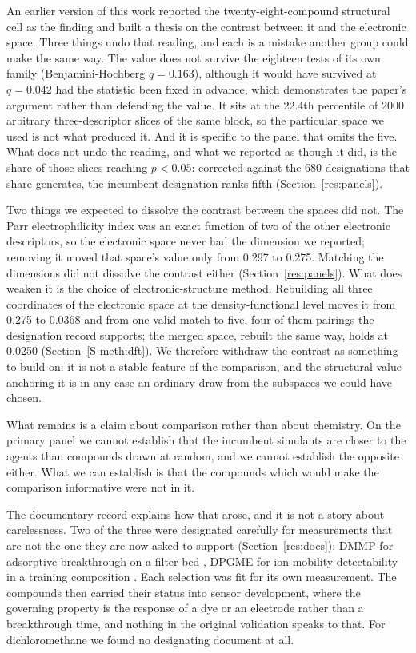 \documentclass[1p,times]{elsarticle}
\begin{document}
An earlier version of this work reported the twenty-eight-compound structural
cell as the finding and built a thesis on the contrast between it
and the electronic space. Three things undo that reading, and each is a mistake
another group could make the same way. The value does not survive the eighteen
tests of its own family (Benjamini-Hochberg $q = 0.163$), although it would have
survived at $q = 0.042$ had the statistic been fixed in advance, which
demonstrates the paper's argument rather than defending the value. It sits at the
22.4th percentile of 2000 arbitrary three-descriptor slices of the same block,
so the particular space we used is not what produced it. And it is specific to
the panel that omits the five. What does not undo the reading, and what we
reported as though it did, is the share of those slices reaching $p<0.05$:
corrected against the 680 designations that share generates, the incumbent
designation ranks fifth (Section~\ref{res:panels}).

Two things we expected to dissolve the contrast between the spaces did not. The
Parr electrophilicity index was an exact function of two of the other electronic
descriptors, so the electronic space never had the dimension we reported;
removing it moved that space's value only from 0.297 to 0.275. Matching the
dimensions did not dissolve the contrast either (Section~\ref{res:panels}). What
does weaken it is the choice of electronic-structure method. Rebuilding all
three coordinates of the electronic space at the density-functional level moves
it from 0.275 to 0.0368 and from one valid match to five, four of them pairings
the designation record supports; the merged space, rebuilt the same way, holds
at 0.0250 (Section~\ref{S-meth:dft}). We therefore withdraw the
contrast as something to build on: it is not a stable feature of the comparison,
and the structural value anchoring it is in any case an ordinary draw from the
subspaces we could have chosen.

What remains is a claim about comparison rather than about chemistry. On the
primary panel we cannot establish that the incumbent simulants are closer to the
agents than compounds drawn at random, and we cannot establish the opposite
either. What we can establish is that the compounds which would make the
comparison informative were not in it.

The documentary record explains how that arose, and it is not a story about
carelessness. Two of the three were designated carefully for measurements that
are not the one they are now asked to support (Section~\ref{res:docs}): DMMP
for adsorptive breakthrough on a filter bed \cite{niosh2002simulant}, DPGME for
ion-mobility detectability in a training composition
\cite{seitzinger2006simulant}. Each selection was fit for its own measurement.
The compounds then carried their status into sensor development, where the
governing property is the response of a dye or an electrode rather than a
breakthrough time, and nothing in the original validation speaks to that. For
dichloromethane we found no designating document at all.
\end{document}
